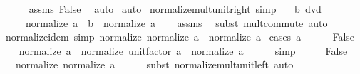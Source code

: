 \begin{isabellebody}
\ \ \ \ \isamarkupfalse%
\ assms\ False\ \isamarkupfalse%
\ auto\isanewline
{}\isamarkupfalse%
\ auto%
\endisatagproof
{\isafoldproof}%
%
\isadelimproof
\isanewline
%
\endisadelimproof
\isanewline
{}\isamarkupfalse%
\ normalize{\isacharunderscore}{\kern0pt}mult{\isacharunderscore}{\kern0pt}unit{\isacharunderscore}{\kern0pt}right\ {\isacharbrackleft}{\kern0pt}simp{\isacharbrackright}{\kern0pt}{\isacharcolon}{\kern0pt}\isanewline
\ \ \ {\isachardoublequoteopen}b\ dvd\ {}{\isachardoublequoteclose}\isanewline
\ \ \ \ \ {\isachardoublequoteopen}normalize\ {\isacharparenleft}{\kern0pt}a\ {\isacharasterisk}{\kern0pt}\ b{\isacharparenright}{\kern0pt}\ {\isacharequal}{\kern0pt}\ normalize\ a{\isachardoublequoteclose}\isanewline
%
\isadelimproof
\ \ %
\endisadelimproof
%
\isatagproof
{}\isamarkupfalse%
\ assms\ \isamarkupfalse%
\ {\isacharparenleft}{\kern0pt}subst\ mult{\isachardot}{\kern0pt}commute{\isacharparenright}{\kern0pt}\ auto%
\endisatagproof
{\isafoldproof}%
%
\isadelimproof
\isanewline
%
\endisadelimproof
\isanewline
{}\isamarkupfalse%
\ normalize{\isacharunderscore}{\kern0pt}idem\ {\isacharbrackleft}{\kern0pt}simp{\isacharbrackright}{\kern0pt}{\isacharcolon}{\kern0pt}\ {\isachardoublequoteopen}normalize\ {\isacharparenleft}{\kern0pt}normalize\ a{\isacharparenright}{\kern0pt}\ {\isacharequal}{\kern0pt}\ normalize\ a{\isachardoublequoteclose}\isanewline
%
\isadelimproof
%
\endisadelimproof
%
\isatagproof
{}\isamarkupfalse%
\ {\isacharparenleft}{\kern0pt}cases\ {\isachardoublequoteopen}a\ {\isacharequal}{\kern0pt}\ {}{\isachardoublequoteclose}{\isacharparenright}{\kern0pt}\isanewline
\ \ \isamarkupfalse%
\ False\isanewline
\ \ \isamarkupfalse%
\ {\isachardoublequoteopen}normalize\ a\ {\isacharequal}{\kern0pt}\ normalize\ {\isacharparenleft}{\kern0pt}unit{\isacharunderscore}{\kern0pt}factor\ a\ {\isacharasterisk}{\kern0pt}\ normalize\ a{\isacharparenright}{\kern0pt}{\isachardoublequoteclose}\isanewline
\ \ \ \ \isamarkupfalse%
\ simp\isanewline
\ \ \isamarkupfalse%
\ \isamarkupfalse%
\ False\ \isamarkupfalse%
\ {\isachardoublequoteopen}{\isasymdots}\ {\isacharequal}{\kern0pt}\ normalize\ {\isacharparenleft}{\kern0pt}normalize\ a{\isacharparenright}{\kern0pt}{\isachardoublequoteclose}\isanewline
\ \ \ \ \isamarkupfalse%
\ {\isacharparenleft}{\kern0pt}subst\ normalize{\isacharunderscore}{\kern0pt}mult{\isacharunderscore}{\kern0pt}unit{\isacharunderscore}{\kern0pt}left{\isacharparenright}{\kern0pt}\ auto\isanewline

\end{isabellebody}
